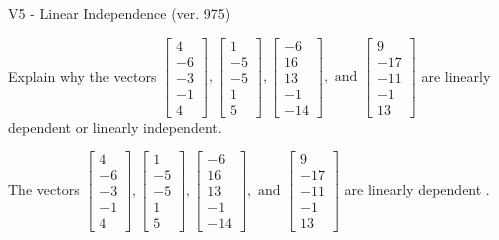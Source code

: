 \begin{exercise}
  \begin{exerciseTitle}V5 - Linear Independence (ver. 975)\end{exerciseTitle}
  \begin{exerciseStatement}
    Explain why the vectors \(\left[\begin{array}{r}
4 \\
-6 \\
-3 \\
-1 \\
4
\end{array}\right] , \left[\begin{array}{r}
1 \\
-5 \\
-5 \\
1 \\
5
\end{array}\right] , \left[\begin{array}{r}
-6 \\
16 \\
13 \\
-1 \\
-14
\end{array}\right] , \text{ and } \left[\begin{array}{r}
9 \\
-17 \\
-11 \\
-1 \\
13
\end{array}\right]\) are linearly dependent or linearly independent.	


  \end{exerciseStatement}
  \begin{exerciseAnswer}
   The vectors \(\left[\begin{array}{r}
4 \\
-6 \\
-3 \\
-1 \\
4
\end{array}\right] , \left[\begin{array}{r}
1 \\
-5 \\
-5 \\
1 \\
5
\end{array}\right] , \left[\begin{array}{r}
-6 \\
16 \\
13 \\
-1 \\
-14
\end{array}\right] , \text{ and } \left[\begin{array}{r}
9 \\
-17 \\
-11 \\
-1 \\
13
\end{array}\right]\) are 
  	 linearly dependent  .
  


  \end{exerciseAnswer}
\end{exercise}